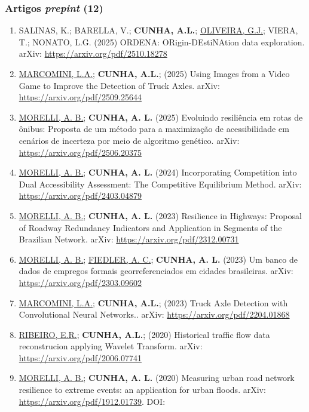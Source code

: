 \documentclass[
  brazilian,
  11pt,
  a4paper,
]{article}
\begin{document}
\subsubsection{\texorpdfstring{Artigos \emph{prepint}
(12)}{Artigos prepint (12)}}\label{artigos-prepint-12}

\begin{enumerate}
\def\labelenumi{\arabic{enumi}.}
\item
  SALINAS, K.; BARELLA, V.; \textbf{CUNHA, A.L.}; \ul{OLIVEIRA, G.J.};
  VIERA, T.; NONATO, L.G. (2025) ORDENA: ORigin-DEstiNAtion data
  exploration. arXiv: \url{https://arxiv.org/pdf/2510.18278}
\item
  \ul{MARCOMINI, L.A.}; \textbf{CUNHA, A.L.}; (2025) Using Images from a
  Video Game to Improve the Detection of Truck Axles. arXiv:
  \url{https://arxiv.org/pdf/2509.25644}
\item
  \ul{MORELLI, A. B.}; \textbf{CUNHA, A. L.} (2025) Evoluindo
  resiliência em rotas de ônibus: Proposta de um método para a
  maximização de acessibilidade em cenários de incerteza por meio de
  algoritmo genético. arXiv: \url{https://arxiv.org/pdf/2506.20375}
\item
  \ul{MORELLI, A. B.}; \textbf{CUNHA, A. L.} (2024) Incorporating
  Competition into Dual Accessibility Assessment: The Competitive
  Equilibrium Method. arXiv: \url{https://arxiv.org/pdf/2403.04879}
\item
  \ul{MORELLI, A. B.}; \textbf{CUNHA, A. L.} (2023) Resilience in
  Highways: Proposal of Roadway Redundancy Indicators and Application in
  Segments of the Brazilian Network. arXiv:
  \url{https://arxiv.org/pdf/2312.00731}
\item
  \ul{MORELLI, A. B.}; \ul{FIEDLER, A. C.}; \textbf{CUNHA, A. L.} (2023)
  Um banco de dados de empregos formais georreferenciados em cidades
  brasileiras. arXiv: \url{https://arxiv.org/pdf/2303.09602}
\item
  \ul{MARCOMINI, L.A.}; \textbf{CUNHA, A.L.}; (2023) Truck Axle
  Detection with Convolutional Neural Networks.. arXiv:
  \url{https://arxiv.org/pdf/2204.01868}
\item
  \ul{RIBEIRO, E.R.}; \textbf{CUNHA, A.L.}; (2020) Historical traffic
  flow data reconstrucion applying Wavelet Transform. arXiv:
  \url{https://arxiv.org/pdf/2006.07741}
\item
  \ul{MORELLI, A. B.}; \textbf{CUNHA, A. L.} (2020) Measuring urban road
  network resilience to extreme events: an application for urban floods.
  arXiv: \url{https://arxiv.org/pdf/1912.01739}. DOI:

\end{enumerate}
\end{document}
